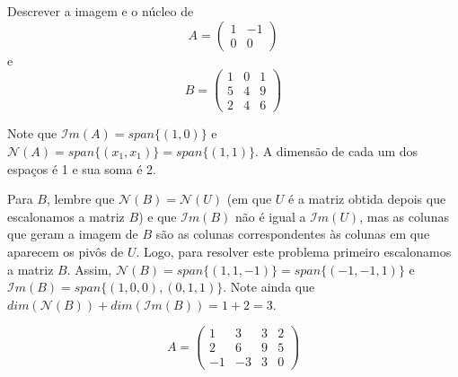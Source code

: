 \begin{exemplo}
   Descrever a imagem e o núcleo de 
   \begin{equation*}
      A = \begin{pmatrix} 1 & -1 \\ 0 & 0\end{pmatrix}
   \end{equation*}
   e
   \begin{equation*}
      B = \begin{pmatrix} 1 & 0 & 1\\ 5 & 4 & 9\\ 2 & 4 & 6\end{pmatrix}
   \end{equation*}
   
   Note que ${\mathcal{I}}m(A) = span\{ (1,0)\}$ e ${\mathcal{N}}(A) = span\{ (x_1,x_1)\} = span\{ (1,1)\}$. A dimensão de cada um dos espaços é 1 e sua soma é 2.

   Para $B$, lembre que ${\mathcal{N}}(B) = {\mathcal{N}}(U)$ (em que $U$ é a matriz obtida depois que escalonamos a matriz $B$) e que ${\mathcal{I}}m(B)$ não é igual a ${\mathcal{I}}m(U)$, mas as colunas que geram a imagem de $B$ são as colunas correspondentes às colunas em que aparecem os pivôs de $U$. Logo, para resolver este problema primeiro escalonamos a matriz $B$. Assim, ${\mathcal{N}}(B) = span\{ (1,1,-1)\} = span\{ (-1,-1,1)\}$ e ${\mathcal{I}}m(B) = span\{ (1,0,0), (0,1,1)\}$. Note ainda que $dim({\mathcal{N}}(B)) + dim({\mathcal{I}}m(B)) = 1+2=3$.   
\end{exemplo}

\begin{exemplo}
   \begin{equation*}
      A = \begin{pmatrix} 1 & 3 & 3 & 2\\2 & 6 & 9 & 5\\-1 & -3 & 3 & 0\end{pmatrix}
   \end{equation*}
\end{exemplo}

